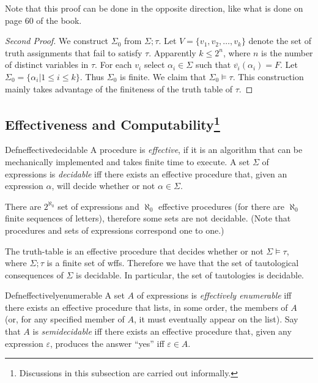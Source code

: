 Note that this proof can be done in the opposite direction, like what is done on page 60 of the book.

\begin{proof}[Second Proof]
  We construct $\Sigma_0$ from $\Sigma;\tau$. Let $V=\{v_1,v_2,\dots,v_k\}$ denote the set of truth assignments that fail to satisfy $\tau$. Apparently $k\leq2^n$, where $n$ is the number of distinct variables in $\tau$. For each $v_i$ select $\alpha_i\in \Sigma$ such that $\overline{v_i}(\alpha_i)=F$. Let $\Sigma_0=\{\alpha_i|1\leq i\leq k\}$. Thus $\Sigma_0$ is finite. We claim that $\Sigma_0\vDash \tau$. This construction mainly takes advantage of the finiteness of the truth table of $\tau$.
\end{proof}

\subsection*{Effectiveness and Computability\footnote{Discussions in this subsection are carried out informally.}}

\begin{reference}{Defn}{effectivedecidable}
  A procedure is \textit{effective}, if it is an algorithm that can be mechanically implemented and takes finite time to execute. A set $\Sigma$ of expressions is \textit{decidable} iff there exists an effective procedure that, given an expression $\alpha$, will decide whether or not $\alpha\in \Sigma$.
\end{reference}

There are $2^{\aleph_0}$ set of expressions and $\aleph_0$ effective procedures (for there are $\aleph_0$ finite sequences of letters), therefore some sets are not decidable. (Note that procedures and sets of expressions correspond one to one.)

The truth-table is an effective procedure that decides whether or not $\Sigma\vDash \tau$, where $\Sigma;\tau$ is a finite set of wffs. Therefore we have that the set of tautological consequences of $\Sigma$ is decidable. In particular, the set of tautologies is decidable.

\begin{reference}{Defn}{effectivelyenumerable}
  A set $A$ of expressions is \textit{effectively enumerable} iff there exists an effective procedure that lists, in some order, the members of $A$ (or, for any specified member of $A$, it must eventually appear on the list). Say that $A$ is \textit{semidecidable} iff there exists an effective procedure that, given any expression $\varepsilon$, produces the answer ``yes'' iff $\varepsilon\in A$.
\end{reference}

